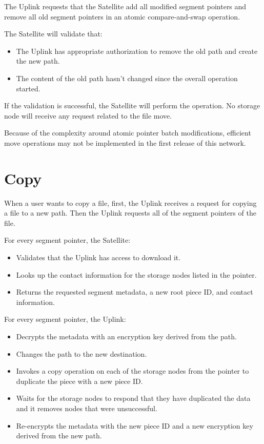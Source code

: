 \documentclass[8pt,fleqn,openany]{book}
\begin{document}
 The Uplink requests that the Satellite add
  all modified segment pointers and remove all old segment pointers in an
  atomic compare-and-swap operation.

The Satellite will validate that:
\begin{itemize}
\item The Uplink has appropriate authorization to remove the old path and create
  the new path.
\item The content of the old path hasn't changed since the overall operation
  started.
\end{itemize}

If the validation is successful, the Satellite will perform the operation.
 No storage node will receive any request related to the file move.

Because of the complexity around atomic pointer batch modifications, efficient
move operations may not be implemented in the first release of this network.

\section{Copy}

When a user wants to copy a file, first, the Uplink receives a request for
copying a file to a new path.
Then the Uplink requests all of the segment pointers of the file.

For every segment pointer, the Satellite:
  \begin{itemize}
  \item Validates that the Uplink has access to download it.
  \item Looks up the contact information for the storage nodes listed in the
    pointer.
  \item Returns the requested segment metadata, a new root piece ID, and
    contact information.
  \end{itemize}

For every segment pointer, the Uplink:
  \begin{itemize}
  \item Decrypts the metadata with an encryption key derived from the path.
  \item Changes the path to the new destination.
  \item Invokes a copy operation on each of the storage nodes from the pointer
    to duplicate the piece with a new piece ID.
  \item Waits for the storage nodes to respond that they have duplicated the
    data and it removes nodes that were unsuccessful.
  \item Re-encrypts the metadata with the new piece ID and a new encryption key
    derived from the new path.
  \end{itemize}
\end{document}
